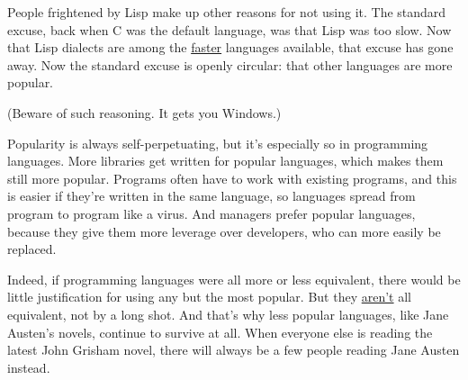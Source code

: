 People
                  frightened by Lisp make up other reasons for not using it. The
                  standard excuse, back when C was the default language, was
                  that Lisp was too slow. Now that Lisp dialects are among the
                  \href{http://shootout.alioth.debian.org/benchmark.php?test=nestedloop\&lang=all\&sort=cpu}{faster}
                  languages available, that excuse has gone away. Now the
                  standard excuse is openly circular: that other languages are
                  more popular.

(Beware of such reasoning. It gets
                  you Windows.)

Popularity is always
                  self-perpetuating, but it's especially so in programming
                  languages. More libraries get written for popular languages,
                  which makes them still more popular. Programs often have to
                  work with existing programs, and this is easier if they're
                  written in the same language, so languages spread from program
                  to program like a virus. And managers prefer popular
                  languages, because they give them more leverage over
                  developers, who can more easily be replaced.

Indeed,
                  if programming languages were all more or less equivalent,
                  there would be little justification for using any but the most
                  popular. But they \href{http://www.paulgraham.com/icad.html}{aren't} all
                  equivalent, not by a long shot. And that's why less popular
                  languages, like Jane Austen's novels, continue to survive at
                  all. When everyone else is reading the latest John Grisham
                  novel, there will always be a few people reading Jane Austen
                  instead.


              
            
          
